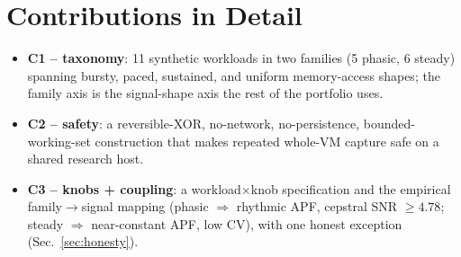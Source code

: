 \documentclass[conference]{IEEEtran}
\begin{document}
\section{Contributions in Detail}
\label{sec:contrib}
\begin{itemize}
  \item \textbf{C1 -- taxonomy}: 11 synthetic workloads in two families
        (5 phasic, 6 steady) spanning bursty, paced, sustained, and uniform
        memory-access shapes; the family axis is the signal-shape axis the rest
        of the portfolio uses.
  \item \textbf{C2 -- safety}: a reversible-XOR, no-network, no-persistence,
        bounded-working-set construction that makes repeated whole-VM capture
        safe on a shared research host.
  \item \textbf{C3 -- knobs + coupling}: a workload$\times$knob specification
        and the empirical family$\to$signal mapping (phasic $\Rightarrow$
        rhythmic APF, cepstral SNR $\ge \num{4.78}$; steady $\Rightarrow$
        near-constant APF, low CV), with one honest exception
        (Sec.~\ref{sec:honesty}).
\end{itemize}

\end{document}
